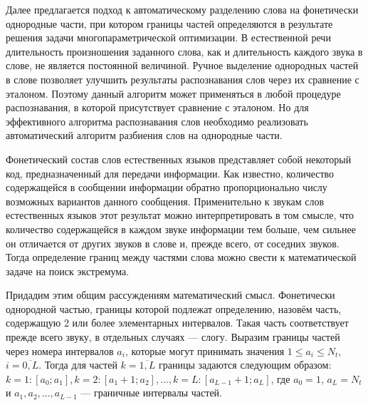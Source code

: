 Далее предлагается подход к автоматическому разделению слова на фонетически однородные части, при котором границы частей определяются в результате решения задачи многопараметрической оптимизации.
В естественной речи длительность произношения заданного слова, как и длительность каждого звука в слове, не является постоянной величиной.
Ручное выделение однородных частей в слове позволяет улучшить результаты распознавания слов через их сравнение с эталоном.
Поэтому данный алгоритм может применяться в любой процедуре распознавания, в которой присутствует сравнение с эталоном.
Но для эффективного алгоритма распознавания слов необходимо реализовать автоматический алгоритм разбиения слов на однородные части.

Фонетический состав слов естественных языков представляет собой некоторый код, предназначенный для передачи информации.
Как известно, количество содержащейся в сообщении информации обратно пропорционально числу возможных вариантов данного сообщения.
Применительно к звукам слов естественных языков этот результат можно интерпретировать в том смысле, что количество содержащейся в каждом звуке информации тем больше, чем сильнее он отличается от других звуков в слове и, прежде всего, от соседних звуков.
Тогда определение границ между частями слова можно свести к математической задаче на поиск экстремума.

Придадим этим общим рассуждениям математический смысл.
Фонетически однородной частью, границы которой подлежат определению, назовём часть, содержащую 2 или более элементарных интервалов.
Такая часть соответствует прежде всего звуку, в отдельных случаях --- слогу.
Выразим границы частей через номера интервалов $a_i$, которые могут принимать значения $1 \le a_i \le N_t$, $i = \overline{0, L}$.
Тогда для частей $k = \overline{1, L}$ границы задаются следующим образом: $k = 1 : [a_0; a_1], k = 2 : [a_1 + 1; a_2], \dots, k = L : [a_{L-1} + 1; a_L]$,
где $a_0 = 1$, $a_L = N_t$ и $a_1, a_2, \dots, a_{L-1}$ --- граничные интервалы частей.

